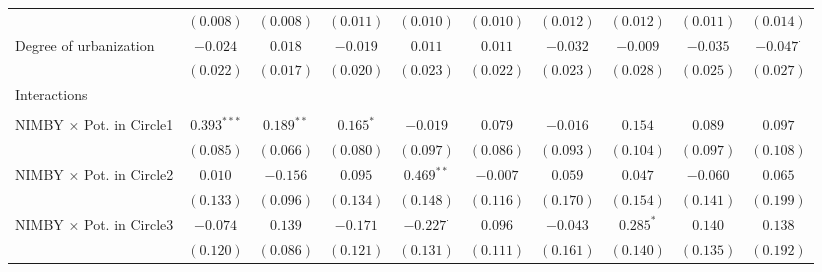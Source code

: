 \begin{center}
\begin{small}
\begin{longtable}{l@{} c@{} c@{} c@{} c@{} c@{} c@{} c@{} c@{} c@{}}
                                    & $(0.008)$        & $(0.008)$       & $(0.011)$       & $(0.010)$        & $(0.010)$        & $(0.012)$        & $(0.012)$        & $(0.011)$        & $(0.014)$        \\
\quad Degree of urbanization        & $-0.024$         & $0.018$         & $-0.019$        & $0.011$          & $0.011$          & $-0.032$         & $-0.009$         & $-0.035$         & $-0.047^{\cdot}$ \\
                                    & $(0.022)$        & $(0.017)$       & $(0.020)$       & $(0.023)$        & $(0.022)$        & $(0.023)$        & $(0.028)$        & $(0.025)$        & $(0.027)$        \\
Interactions                        &                  &                 &                 &                  &                  &                  &                  &                  &                  \\
                                    &                  &                 &                 &                  &                  &                  &                  &                  &                  \\
\quad NIMBY × Pot. in Circle1       & $0.393^{***}$    & $0.189^{**}$    & $0.165^{*}$     & $-0.019$         & $0.079$          & $-0.016$         & $0.154$          & $0.089$          & $0.097$          \\
                                    & $(0.085)$        & $(0.066)$       & $(0.080)$       & $(0.097)$        & $(0.086)$        & $(0.093)$        & $(0.104)$        & $(0.097)$        & $(0.108)$        \\
\quad NIMBY × Pot. in Circle2       & $0.010$          & $-0.156$        & $0.095$         & $0.469^{**}$     & $-0.007$         & $0.059$          & $0.047$          & $-0.060$         & $0.065$          \\
                                    & $(0.133)$        & $(0.096)$       & $(0.134)$       & $(0.148)$        & $(0.116)$        & $(0.170)$        & $(0.154)$        & $(0.141)$        & $(0.199)$        \\
\quad NIMBY × Pot. in Circle3       & $-0.074$         & $0.139$         & $-0.171$        & $-0.227^{\cdot}$ & $0.096$          & $-0.043$         & $0.285^{*}$      & $0.140$          & $0.138$          \\
                                    & $(0.120)$        & $(0.086)$       & $(0.121)$       & $(0.131)$        & $(0.111)$        & $(0.161)$        & $(0.140)$        & $(0.135)$        & $(0.192)$        \\

\end{longtable}
\end{small}
\end{center}
